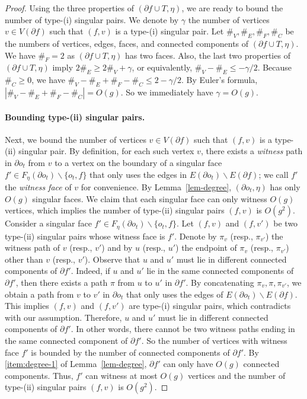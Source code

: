 \documentclass[a4paper,11pt]{article}
\numberwithin{lemma}{section}
\begin{document}
\begin{proof}
Using the three properties of $(\partial f \cup T, \eta)$, we are ready to bound the number of type-(i) singular pairs.
We denote by $\gamma$ the number of vertices $v \in V(\partial f)$ such that $(f,v)$ is a type-(i) singular pair.
Let $\#_V,\#_E,\#_F,\#_C$ be the numbers of vertices, edges, faces, and connected components of $(\partial f \cup T, \eta)$.
We have $\#_F = 2$ as $(\partial f \cup T, \eta)$ has two faces.
Also, the last two properties of $(\partial f \cup T, \eta)$ imply $2\#_E \geq 2\#_V + \gamma$, or equivalently, $\#_V - \#_E \leq -\gamma/2$.
Because $\#_C \geq 0$, we have $\#_V-\#_E+\#_F-\#_C \leq 2-\gamma/2$.
By Euler's formula, $|\#_V-\#_E+\#_F-\#_C| = O(g)$.
So we immediately have $\gamma = O(g)$.

\paragraph{Bounding type-(ii) singular pairs.}
Next, we bound the number of vertices $v \in V(\partial f)$ such that $(f,v)$ is a type-(ii) singular pair.
By definition, for each such vertex $v$, there exists a \textit{witness} path in $\partial o_t$ from $v$ to a vertex on the boundary of a singular face $f' \in F_\eta(\partial o_t) \backslash \{o_t,f\}$ that only uses the edges in $E(\partial o_t) \backslash E(\partial f)$; we call $f'$ the \textit{witness face} of $v$ for convenience.
By Lemma~\ref{lem-degree}, $(\partial o_t,\eta)$ has only $O(g)$ singular faces.
We claim that each singular face can only witness $O(g)$ vertices, which implies the number of type-(ii) singular pairs $(f,v)$ is $O(g^2)$.
Consider a singular face $f' \in F_\eta(\partial o_t) \backslash \{o_t,f\}$.
Let $(f,v)$ and $(f,v')$ be two type-(ii) singular pairs whose witness face is $f'$.
Denote by $\pi_v$ (resp., $\pi_{v'}$) the witness path of $v$ (resp., $v'$) and by $u$ (resp., $u'$) the endpoint of $\pi_v$ (resp., $\pi_{v'}$) other than $v$ (resp., $v'$).
Observe that $u$ and $u'$ must lie in different connected components of $\partial f'$.
Indeed, if $u$ and $u'$ lie in  the same connected components of $\partial f'$, then there exists a path $\pi$ from $u$ to $u'$ in $\partial f'$.
By concatenating $\pi_v,\pi,\pi_{v'}$, we obtain a path from $v$ to $v'$ in $\partial o_t$ that only uses the edges of $E(\partial o_t) \backslash E(\partial f)$.
This implies $(f,v)$ and $(f,v')$ are type-(i) singular pairs, which contradicts with our assumption.
Therefore, $u$ and $u'$ must lie in different connected components of $\partial f'$.
In other words, there cannot be two witness paths ending in the same connected component of $\partial f'$.
So the number of vertices with witness face $f'$ is bounded by the number of connected components of $\partial f'$.
By \ref{item:degree-1} of Lemma~\ref{lem-degree}, $\partial f'$ can only have $O(g)$ connected components.
Thus, $f'$ can witness at most $O(g)$ vertices and the number of type-(ii) singular pairs $(f,v)$ is $O(g^2)$.
\end{proof}
\end{document}
